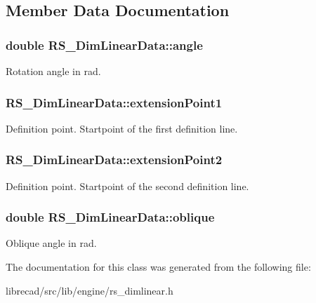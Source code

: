 \subsection{Member Data Documentation}
\hypertarget{classRS__DimLinearData_adf69c492012326e50f4cafe9c112e0f3}{
\subsubsection[{angle}]{\setlength{\rightskip}{0pt plus 5cm}double R\-S\-\_\-\-Dim\-Linear\-Data\-::angle}}\label{classRS__DimLinearData_adf69c492012326e50f4cafe9c112e0f3}
Rotation angle in rad. \hypertarget{classRS__DimLinearData_a7f424f8b4579d701d8c056ddcb7bb01b}{
\subsubsection[{extension\-Point1}]{ R\-S\-\_\-\-Dim\-Linear\-Data\-::extension\-Point1}}\label{classRS__DimLinearData_a7f424f8b4579d701d8c056ddcb7bb01b}
Definition point. Startpoint of the first definition line. \hypertarget{classRS__DimLinearData_ac4728ec01a1db5bcdc5666f138e82f83}{
\subsubsection[{extension\-Point2}]{ R\-S\-\_\-\-Dim\-Linear\-Data\-::extension\-Point2}}\label{classRS__DimLinearData_ac4728ec01a1db5bcdc5666f138e82f83}
Definition point. Startpoint of the second definition line. \hypertarget{classRS__DimLinearData_a2c6e039d704b4343a3b4392d81490797}{
\subsubsection[{oblique}]{\setlength{\rightskip}{0pt plus 5cm}double R\-S\-\_\-\-Dim\-Linear\-Data\-::oblique}}\label{classRS__DimLinearData_a2c6e039d704b4343a3b4392d81490797}
Oblique angle in rad. 

The documentation for this class was generated from the following file\-:\begin{DoxyCompactItemize}
\item 
librecad/src/lib/engine/rs\-\_\-dimlinear.\-h\end{DoxyCompactItemize}
